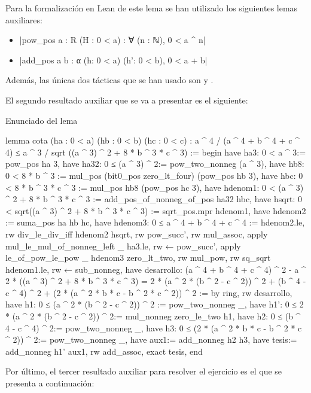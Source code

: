 Para la formalización en Lean de este lema se han utilizado los
siguientes lemas auxiliares:
\begin{itemize}
\item {}|pow_pos {a : R} (H : 0 < a) : ∀ (n : ℕ), 0 < a ^ n|
\item {}|add_pos {a b : α} (h: 0 < a) (h': 0 < b), 0 < a + b|
\end{itemize}

Además, las únicas dos tácticas que se han usado son
 y
.


El segundo resultado auxiliar que se va a presentar es el siguiente:

Enunciado del lema

\begin{leancode}
  lemma cota (ha : 0 < a) (hb : 0 < b) (hc : 0 < c) :
  a ^ 4 / (a ^ 4 + b ^ 4 + c ^ 4) ≤
  a ^ 3 / sqrt ((a ^ 3) ^ 2 + 8 * b ^ 3 * c ^ 3) :=
begin
  have ha3: 0 < a ^ 3:= pow_pos ha 3,
  have ha32: 0 ≤  (a ^ 3) ^ 2:= pow_two_nonneg (a ^ 3),
  have hb8: 0 < 8 * b ^ 3 := mul_pos (bit0_pos zero_lt_four) (pow_pos hb 3),
  have hbc: 0 < 8 * b ^ 3 * c ^ 3 := mul_pos hb8 (pow_pos hc 3),
  have hdenom1: 0 < (a ^ 3) ^ 2 + 8 * b ^ 3 * c ^ 3 := add_pos_of_nonneg_of_pos ha32 hbc,
  have hsqrt: 0 < sqrt((a ^ 3) ^ 2 + 8 * b ^ 3 * c ^ 3) := sqrt_pos.mpr hdenom1,
  have hdenom2 := suma_pos ha hb hc,
  have hdenom3: 0 ≤ a ^ 4 + b ^ 4 + c ^ 4 := hdenom2.le,
  rw div_le_div_iff hdenom2 hsqrt,
  rw pow_succ',
  rw mul_assoc,
  apply mul_le_mul_of_nonneg_left _ ha3.le,
  rw ← pow_succ',
  apply le_of_pow_le_pow _ hdenom3 zero_lt_two,
  rw mul_pow,
  rw sq_sqrt hdenom1.le,
  rw ← sub_nonneg,
  have desarrollo: (a ^ 4 + b ^ 4 + c ^ 4) ^ 2 - a ^ 2 * ((a ^ 3) ^ 2 + 8 * b ^ 3 * c ^ 3)
      = 2 * (a ^ 2 * (b ^ 2 - c ^ 2)) ^ 2 + (b ^ 4 - c ^ 4) ^ 2 +
        (2 * (a ^ 2 * b * c - b ^ 2 * c ^ 2)) ^ 2 := by ring,
  rw desarrollo,
  have h1: 0 ≤ (a ^ 2 * (b ^ 2 - c ^ 2)) ^ 2 := pow_two_nonneg _,
  have h1': 0 ≤ 2 * (a ^ 2 * (b ^ 2 - c ^ 2)) ^ 2:= mul_nonneg zero_le_two h1,
  have h2: 0 ≤ (b ^ 4 - c ^ 4) ^ 2:= pow_two_nonneg _,
  have h3: 0 ≤ (2 * (a ^ 2 * b * c - b ^ 2 * c ^ 2)) ^ 2:= pow_two_nonneg _,
  have aux1:= add_nonneg h2 h3,
  have tesis:= add_nonneg h1' aux1,
  rw add_assoc,
  exact tesis,
end
\end{leancode}

Por último, el tercer resultado auxiliar para resolver el ejercicio es el que
se presenta a continuación:

